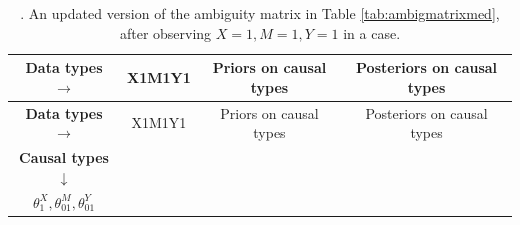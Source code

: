\documentclass[12pt,]{book}
\begin{document}
\begin{longtable}[]{@{}cccc@{}}
\caption{\label{tab:ambigmedupdate2}. An updated version of the ambiguity matrix in Table \ref{tab:ambigmatrixmed}, after observing \(X=1, M=1, Y=1\) in a case.}\tabularnewline
\toprule
\begin{minipage}[b]{0.36\columnwidth}\centering
\textbf{Data types} \(\rightarrow\)\strut
\end{minipage} & \begin{minipage}[b]{0.07\columnwidth}\centering
X1M1Y1\strut
\end{minipage} & \begin{minipage}[b]{0.21\columnwidth}\centering
Priors on causal types\strut
\end{minipage} & \begin{minipage}[b]{0.25\columnwidth}\centering
Posteriors on causal types\strut
\end{minipage}\tabularnewline
\midrule
\endfirsthead
\toprule
\begin{minipage}[b]{0.36\columnwidth}\centering
\textbf{Data types} \(\rightarrow\)\strut
\end{minipage} & \begin{minipage}[b]{0.07\columnwidth}\centering
X1M1Y1\strut
\end{minipage} & \begin{minipage}[b]{0.21\columnwidth}\centering
Priors on causal types\strut
\end{minipage} & \begin{minipage}[b]{0.25\columnwidth}\centering
Posteriors on causal types\strut
\end{minipage}\tabularnewline
\midrule
\endhead
\begin{minipage}[t]{0.36\columnwidth}\centering
\textbf{Causal types} \(\downarrow\)\strut
\end{minipage} & \begin{minipage}[t]{0.07\columnwidth}\centering
\strut
\end{minipage} & \begin{minipage}[t]{0.21\columnwidth}\centering
\strut
\end{minipage} & \begin{minipage}[t]{0.25\columnwidth}\centering
\strut
\end{minipage}\tabularnewline
\begin{minipage}[t]{0.36\columnwidth}\centering
\(\theta^X_1,\theta^M_{01},\theta^Y_{01}\)\strut
\end{minipage} & \begin{minipage}[t]{0.07\columnwidth}\centering

\end{minipage}
\end{longtable}
\end{document}
